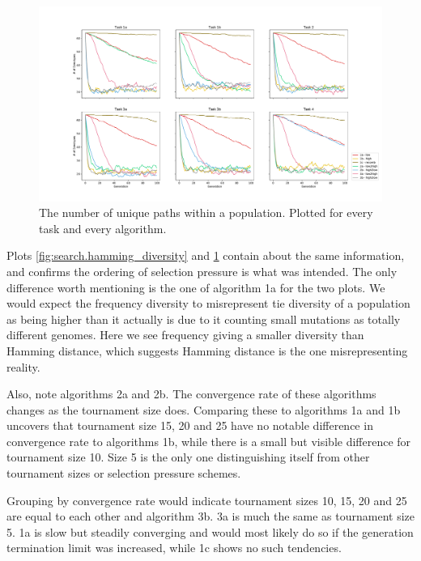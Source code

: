 \begin{figure}
    \includegraphics[width=1.2\textwidth,center]{Chapters/4.Experiments/exp2/figures/large/frequency_diversity_unique_path_count.pdf}
    \caption[Unique genome frequency diversity]{The number of unique paths within a population. Plotted for every task and every algorithm.}
    \label{fig:search.frequency_diversity_unique}
\end{figure}

Plots \ref{fig:search.hamming_diversity} and \ref{fig:search.frequency_diversity_unique} contain about the same information, and confirms the ordering of selection pressure is what was intended. The only difference worth mentioning is the one of algorithm 1a for the two plots. We would expect the frequency diversity to misrepresent tie diversity of a population as being higher than it actually is due to it counting small mutations as totally different genomes. Here we see frequency giving a smaller diversity than Hamming distance, which suggests Hamming distance is the one misrepresenting reality. 

Also, note algorithms 2a and 2b. The convergence rate of these algorithms changes as the tournament size does. Comparing these to algorithms 1a and 1b uncovers that tournament size 15, 20 and 25 have no notable difference in convergence rate to algorithms 1b, while there is a small but visible difference for tournament size 10. Size 5 is the only one distinguishing itself from other tournament sizes or selection pressure schemes. 

Grouping by convergence rate would indicate tournament sizes 10, 15, 20 and 25 are equal to each other and algorithm 3b. 3a is much the same as tournament size 5. 1a is slow but steadily converging and would most likely do so if the generation termination limit was increased, while 1c shows no such tendencies. 


